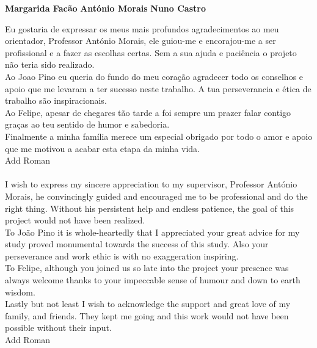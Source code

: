 \documentclass[10pt]{report}
\renewcommand{\(}{\left(}
\renewcommand{\)}{\right)}
\renewcommand{\[}{\left[}
\renewcommand{\]}{\right]}
\begin{document}
\TitlePage
  \vspace*{55mm}
       {}
       {\textbf{Margarida Facão}}
  \vspace*{5mm}
       {\textbf{António Morais}}
  \vspace*{5mm}
  \TEXT{}
       {\textbf{Nuno Castro}}
  \vspace*{5mm}
\EndTitlePage
\titlepage\ \endtitlepage %

\TitlePage
  \vspace*{55mm}
       {Eu gostaria de expressar os meus mais profundos agradecimentos ao meu orientador, Professor António Morais, ele guiou-me e encorajou-me a ser profissional e a fazer as escolhas certas. Sem a sua ajuda e paciência o projeto não teria sido realizado.  
       \\
       Ao Joao Pino eu queria do fundo do meu coração agradecer todo os conselhos e apoio que me levaram a ter sucesso neste trabalho. A tua perseverancia e ética de trabalho são inspiracionais.
       \\ 
       Ao Felipe, apesar de chegares tão tarde a foi sempre um prazer falar contigo graças ao teu sentido de humor e sabedoria. 
       \\ 
       Finalmente a minha família merece um especial obrigado por todo o amor e apoio que me motivou a acabar esta etapa da minha vida. \\
       {\color{red} Add Roman} 
       \ \\ \ \\ }
  \TEXT{}
       {I wish to express my sincere appreciation to my supervisor, Professor António Morais, he convincingly guided and encouraged me to be professional and do the right thing.  Without his persistent help and endless patience, the goal of this project would not have been realized. 
       \\
       To João Pino it is whole-heartedly that I appreciated your great advice for my study proved monumental towards the success of this study. Also your perseverance and work ethic is with no exaggeration inspiring.
       \\
       To Felipe, although you joined us so late into the project your presence was always welcome thanks to your impeccable sense of humour and down to earth wisdom.
       \\
       Lastly but not least I wish to acknowledge the support and great love of my family, and friends. They kept me going and this work would not have been possible without their input.
       \\ 
   	   {\color{red} Add Roman} }
\EndTitlePage
\titlepage\ \endtitlepage %
\end{document}
